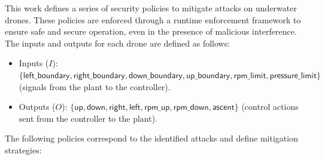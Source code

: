 This work defines a series of security policies to mitigate attacks on underwater drones. These policies are enforced through a runtime enforcement framework to ensure safe and secure operation, even in the presence of malicious interference. The inputs and outputs for each drone are defined as follows:

\begin{itemize}
	\item Inputs ($I$): $\lbrace \mathsf{left\_boundary}, \mathsf{right\_boundary}, \mathsf{down\_boundary}, \mathsf{up\_boundary}, \mathsf{rpm\_limit}, \mathsf{pressure\_limit} \rbrace$ (signals from the plant to the controller).
	\item Outputs ($O$): $\lbrace \mathsf{up}, \mathsf{down}, \mathsf{right}, \mathsf{left}, \mathsf{rpm\_up}, \mathsf{rpm\_down}, \mathsf{ascent} \rbrace$ (control actions sent from the controller to the plant).
\end{itemize}

The following policies correspond to the identified attacks and define mitigation strategies:

